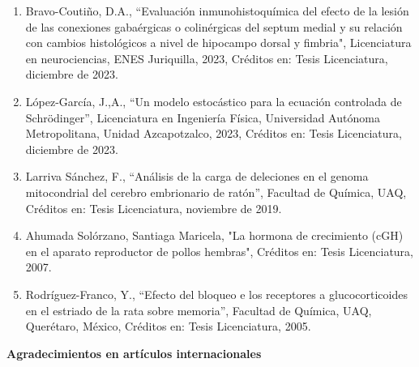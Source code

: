 \documentclass[12pt]{article}
\begin{document}
\begin{enumerate}
\item Bravo-Coutiño, D.A., “Evaluación inmunohistoquímica del efecto de la lesión de las conexiones gabaérgicas o colinérgicas del 
septum 
medial y su relación con cambios histológicos a nivel de hipocampo dorsal y fimbria", Licenciatura en neurociencias, ENES Juriquilla, 
2023, Créditos en: Tesis Licenciatura, diciembre de 2023.

\item López-García, J.,A., “Un modelo estocástico para la ecuación controlada de Schrödinger”, Licenciatura en Ingeniería Física, 
Universidad Autónoma Metropolitana, Unidad Azcapotzalco, 2023, Créditos en: Tesis Licenciatura, diciembre de 2023.

\item Larriva Sánchez, F., “Análisis de la carga de deleciones en el genoma mitocondrial del cerebro embrionario de ratón”, Facultad de 
Química, UAQ, Créditos en: Tesis Licenciatura, noviembre de 2019.

\item Ahumada Solórzano, Santiaga Maricela, "La hormona de crecimiento (cGH) en el aparato reproductor de pollos hembras", Créditos en: 
Tesis Licenciatura, 2007.

\item Rodríguez-Franco, Y., “Efecto del bloqueo e los receptores a glucocorticoides en el estriado de la rata sobre memoria”, Facultad 
de 
Química, UAQ, Querétaro, México, Créditos en: Tesis Licenciatura, 2005.
\end{enumerate}

\textbf{Agradecimientos en artículos internacionales}
\end{document}

